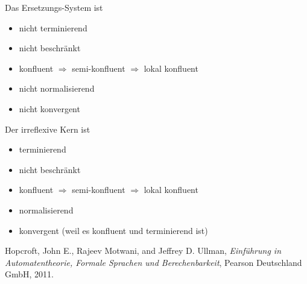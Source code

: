 \documentclass[
  a4paper,
  11pt,
]{scrartcl}
\begin{document}
Das Ersetzungs-System ist
\begin{itemize}
  \item nicht terminierend
  \item nicht beschränkt
  \item konfluent $\Rightarrow$ semi-konfluent $\Rightarrow$ lokal konfluent
  \item nicht normalisierend
  \item nicht konvergent
\end{itemize}

Der irreflexive Kern ist
\begin{itemize}
  \item terminierend
  \item nicht beschränkt
  \item konfluent $\Rightarrow$ semi-konfluent $\Rightarrow$ lokal konfluent
  \item normalisierend
  \item konvergent (weil es konfluent und terminierend ist)
\end{itemize}

\begin{thebibliography}{9}

  Hopcroft, John E., Rajeev Motwani, and Jeffrey D. Ullman,
  \emph{Einführung in Automatentheorie, Formale Sprachen und Berechenbarkeit},
  Pearson Deutschland GmbH,
  2011.

\end{thebibliography}
\end{document}
